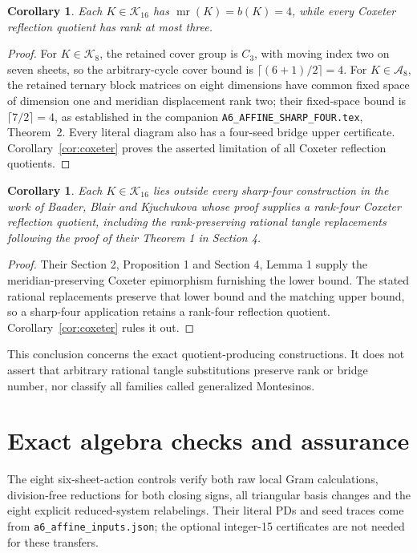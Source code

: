 \documentclass[11pt]{article}
\newtheorem{corollary}[theorem]{Corollary}
\newcommand{\mr}{\operatorname{mr}}
\begin{document}
\begin{corollary}\label{cor:separation}
Each $K\in\mathcal K_{16}$ has $\mr(K)=b(K)=4$, while every Coxeter
reflection quotient has rank at
most three.
\end{corollary}
\begin{proof}
For $K\in\mathcal K_8$, the retained cover group is $C_3$, with
moving index two on seven sheets, so the arbitrary-cycle cover bound
is $\lceil(6+1)/2\rceil=4$. For $K\in\mathcal A_8$, the retained
ternary block matrices on eight dimensions have common fixed space
of dimension one and meridian displacement rank two; their fixed-space
bound is $\lceil7/2\rceil=4$, as established in the companion
\texttt{A6\_AFFINE\_SHARP\_FOUR.tex}, Theorem~2. Every literal
diagram also has a
four-seed bridge upper certificate. Corollary~\ref{cor:coxeter}
proves the asserted limitation of all Coxeter reflection quotients.
\end{proof}

\begin{corollary}\label{cor:bbk}
Each $K\in\mathcal K_{16}$ lies outside every
sharp-four construction in
the work of Baader, Blair and Kjuchukova \cite{bbk} whose proof supplies
a rank-four
Coxeter reflection quotient, including the rank-preserving rational
tangle replacements following the proof of their Theorem 1 in
Section 4.
\end{corollary}
\begin{proof}
Their Section 2, Proposition 1 and Section 4, Lemma 1 supply the
meridian-preserving Coxeter epimorphism furnishing the lower bound.
The stated rational replacements preserve that lower bound and the
matching upper bound, so a sharp-four application retains a rank-four
reflection quotient. Corollary~\ref{cor:coxeter} rules it out.
\end{proof}

This conclusion concerns the exact quotient-producing constructions.
It does not assert that arbitrary rational tangle substitutions
preserve rank or bridge number, nor classify all families called
generalized Montesinos.

\section{Exact algebra checks and assurance}

The eight six-sheet-action controls verify both raw local Gram
calculations, division-free reductions for both closing signs, all
triangular basis changes and the eight explicit reduced-system
relabelings. Their literal PDs and seed traces come from
\texttt{a6\_affine\_inputs.json}; the optional integer-15 certificates
are not needed for these transfers.
\end{document}
